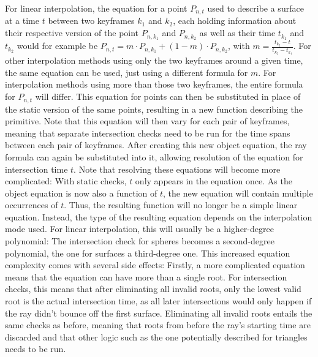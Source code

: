 For linear interpolation,
the equation for a point \(P_{n, t}\) used to describe a surface at a time \(t\) between two keyframes \(k_1\) and \(k_2\),
each holding information about their respective version of the point \(P_{n, k_1}\) and \(P_{n, k_2}\)
as well as their time \(t_{k_1}\) and \(t_{k_2}\)
would for example be \(P_{n, t} = m \cdot P_{n, k_1} + (1-m) \cdot P_{n, k_2}\),
with \(m = \frac{t_{k_2} - t}{t_{k_2} - t_{k_1}}\).
For other interpolation methods using only the two keyframes around a given time,
the same equation can be used, just using a different formula for \(m\).
For interpolation methods using more than those two keyframes,
the entire formula for \(P_{n, t}\) will differ.
\newline
This equation for points can then be substituted in place of the static version of the same points,
resulting in a new function describing the primitive.
Note that this equation will then vary for each pair of keyframes,
meaning that separate intersection checks need to be run for the time spans between each pair of keyframes.
\newline
After creating this new object equation, the ray formula can again be substituted into it,
allowing resolution of the equation for intersection time \(t\).
Note that resolving these equations will become more complicated:
With static checks, \(t\) only appears in the equation once.
As the object equation is now also a function of \(t\),
the new equation will contain multiple occurrences of \(t\).
\newline
Thus, the resulting function will no longer be a simple linear equation.
Instead, the type of the resulting equation depends on the interpolation mode used.
For linear interpolation, this will usually be a higher-degree polynomial:
The intersection check for spheres becomes a second-degree polynomial,
the one for surfaces a third-degree one.
\newline
This increased equation complexity comes with several side effects:
Firstly, a more complicated equation means that the equation can have more than a single root.
For intersection checks, this means that after eliminating all invalid roots,
only the lowest valid root is the actual intersection time,
as all later intersections would only happen if the ray didn't bounce off the first surface.
\newline
Eliminating all invalid roots entails the same checks as before,
meaning that roots from before the ray's starting time are discarded
and that other logic such as the one potentially described for triangles needs to be run.
